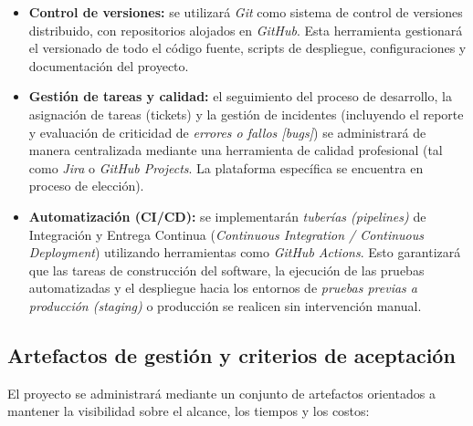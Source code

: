 \begin{itemize}
    \item \textbf{Control de versiones:} se utilizará \textit{Git} como sistema de control de versiones distribuido, con repositorios alojados en \textit{GitHub}. Esta herramienta gestionará el versionado de todo el código fuente, scripts de despliegue, configuraciones y documentación del proyecto.
    \item \textbf{Gestión de tareas y calidad:} el seguimiento del proceso de desarrollo, la asignación de tareas (tickets) y la gestión de incidentes (incluyendo el reporte y evaluación de criticidad de \textit{errores o fallos [bugs]}) se administrará de manera centralizada mediante una herramienta de calidad profesional (tal como \textit{Jira} o \textit{GitHub Projects}. La plataforma específica se encuentra en proceso de elección).
    \item \textbf{Automatización (CI/CD):} se implementarán \textit{tuberías (pipelines)} de Integración y Entrega Continua (\textit{Continuous Integration / Continuous Deployment}) utilizando herramientas como \textit{GitHub Actions}. Esto garantizará que las tareas de construcción del software, la ejecución de las pruebas automatizadas y el despliegue hacia los entornos de \textit{pruebas previas a producción (staging)} o producción se realicen sin intervención manual.
\end{itemize}

\newpage

\subsection{Artefactos de gestión y criterios de aceptación}

El proyecto se administrará mediante un conjunto de artefactos orientados a mantener la visibilidad sobre el alcance, los tiempos y los costos:

